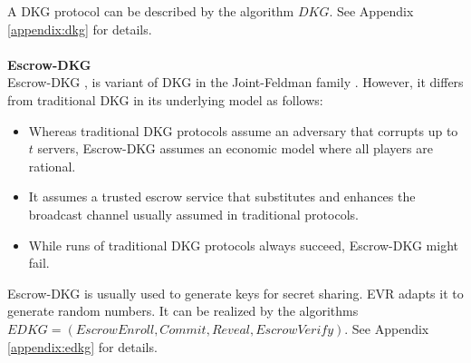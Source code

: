 \documentclass[letterpaper,twocolumn,10pt]{article}
\theoremstyle{definition}
\theoremstyle{remark}
\begin{document}
A DKG protocol can be described by the algorithm $DKG$. See Appendix \ref{appendix:dkg} for details.\\\\
\textbf{Escrow-DKG}\\
Escrow-DKG \cite{david2019rational}, is variant of DKG in the Joint-Feldman
family \cite{gennaro1999secure, gennaro3revisiting}. However, it differs from traditional DKG in its underlying model as follows:
\begin{itemize}
    \item Whereas traditional DKG protocols assume an adversary that corrupts up to $t$ servers, Escrow-DKG assumes an economic model where all players are rational.
    \item It assumes a trusted escrow service that substitutes and enhances the broadcast channel usually assumed in traditional protocols.
    \item While runs of traditional DKG protocols always succeed, Escrow-DKG might fail.
\end{itemize}
Escrow-DKG is usually used to generate keys for secret sharing. EVR adapts it to generate random numbers. It can be realized by the algorithms $EDKG = (EscrowEnroll, Commit, Reveal, EscrowVerify)$. See Appendix \ref{appendix:edkg} for details.
\end{document}
